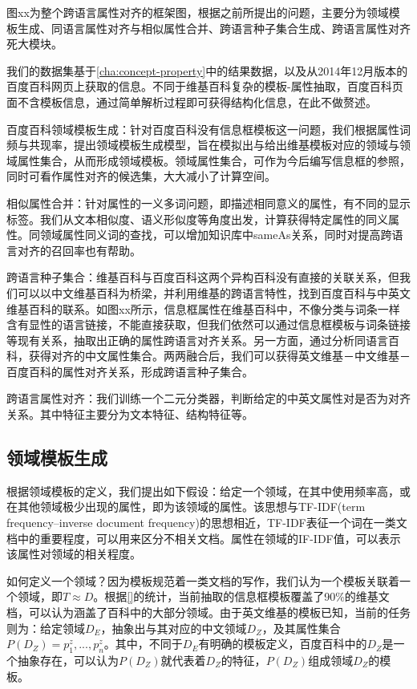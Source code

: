 图xx为整个跨语言属性对齐的框架图，根据之前所提出的问题，主要分为领域模板生成、同语言属性对齐与相似属性合并、跨语言种子集合生成、跨语言属性对齐死大模块。

我们的数据集基于\ref{cha:concept-property}中的结果数据，以及从2014年12月版本的百度百科网页上获取的信息。不同于维基百科复杂的模板-属性抽取，百度百科页面不含模板信息，通过简单解析过程即可获得结构化信息，在此不做赘述。

{\heiti 百度百科领域模板生成：}针对百度百科没有信息框模板这一问题，我们根据属性词频与共现率，提出领域模板生成模型，旨在模拟出与给出维基模板对应的领域与领域属性集合，从而形成领域模板。领域属性集合，可作为今后编写信息框的参照，同时可看作属性对齐的候选集，大大减小了计算空间。

{\heiti 相似属性合并：}针对属性的一义多词问题，即描述相同意义的属性，有不同的显示标签。我们从文本相似度、语义形似度等角度出发，计算获得特定属性的同义属性。同领域属性同义词的查找，可以增加知识库中sameAs关系，同时对提高跨语言对齐的召回率也有帮助。

{\heiti 跨语言种子集合：}维基百科与百度百科这两个异构百科没有直接的关联关系，但我们可以以中文维基百科为桥梁，并利用维基的跨语言特性，找到百度百科与中英文维基百科的联系。如图xx所示，信息框属性在维基百科中，不像分类与词条一样含有显性的语言链接，不能直接获取，但我们依然可以通过信息框模板与词条链接等现有关系，抽取出正确的属性跨语言对齐关系。另一方面，通过分析同语言百科，获得对齐的中文属性集合。两两融合后，我们可以获得英文维基－中文维基－百度百科的属性对齐关系，形成跨语言种子集合。

{\heiti 跨语言属性对齐：}我们训练一个二元分类器，判断给定的中英文属性对是否为对齐关系。其中特征主要分为文本特征、结构特征等。

\subsection{领域模板生成}
\label{sec:domain-template}
根据领域模板的定义，我们提出如下假设：给定一个领域，在其中使用频率高，或在其他领域极少出现的属性，即为该领域的属性。该思想与TF-IDF(term frequency–inverse document frequency)的思想相近，TF-IDF表征一个词在一类文档中的重要程度，可以用来区分不相关文档。属性在领域的IF-IDF值，可以表示该属性对领域的相关程度。

如何定义一个领域？因为模板规范着一类文档的写作，我们认为一个模板关联着一个领域，即$T \approx D$。根据\ref{}的统计，当前抽取的信息框模板覆盖了90\%的维基文档，可以认为涵盖了百科中的大部分领域。由于英文维基的模板已知，当前的任务则为：给定领域$D_E$，抽象出与其对应的中文领域$D_Z$，及其属性集合$P(D_Z)={p_1^z,...,p_n^z}$。其中，不同于$D_E$有明确的模板定义，百度百科中的$D_Z$是一个抽象存在，可以认为$P(D_Z)$就代表着$D_Z$的特征，$P(D_Z)$组成领域$D_Z$的模板。

